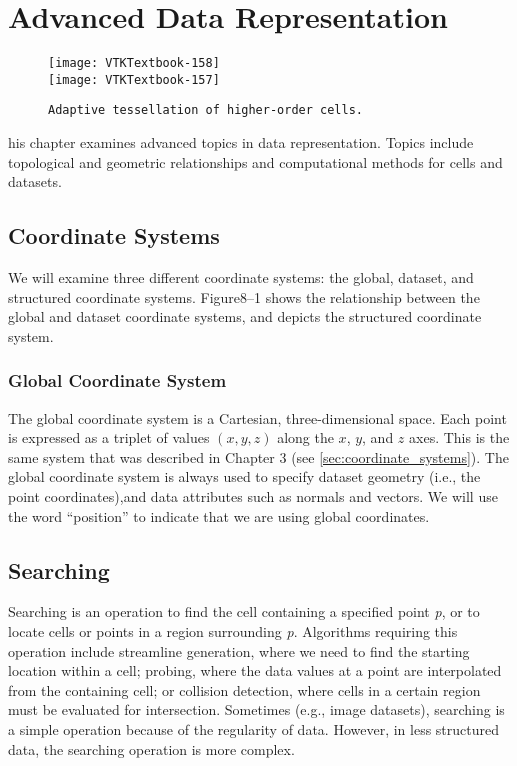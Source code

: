 \chapter{Advanced Data Representation}
\label{chap:advanced_data_representation}

\begin{figure}[ht]
	\hfill
	\begin{minipage}{0.5\textwidth}
		\centering
		\texttt{[image: VTKTextbook-158]}\\
		\texttt{[image: VTKTextbook-157]}
		\caption*{\texttt{Adaptive tessellation of higher-order cells.}}
	\end{minipage}
\end{figure}


his chapter examines advanced topics in data representation.
Topics include topological and geometric relationships and computational methods for cells and datasets.

\section{Coordinate Systems}
We will examine three different coordinate systems: the global, dataset, and structured coordinate systems.
Figure8–1 shows the relationship between the global and dataset coordinate systems, and depicts the structured coordinate system.

\subsection{Global Coordinate System}
The global coordinate system is a Cartesian, three-dimensional space. Each point is expressed as a triplet of values $(x,y,z)$ along the $x$, $y$, and $z$ axes.
This is the same system that was described in Chapter 3 (see \ref{sec:coordinate_systems}).
The global coordinate system is always used to specify dataset geometry (i.e., the point coordinates),and data attributes such as normals and vectors.
We will use the word ``position'' to indicate that we are using global coordinates.

\section{Searching}
\label{sec:searching}
Searching is an operation to find the cell containing a specified point \emph{p}, or to locate cells or points in a region surrounding \emph{p}.
Algorithms requiring this operation include streamline generation, where we need to find the starting location within a cell; probing, where the data values at a point are interpolated from the containing cell; or collision detection, where cells in a certain region must be evaluated for intersection.
Sometimes (e.g., image datasets), searching is a simple operation because of the regularity of data. However, in less structured data, the searching operation is more complex.

